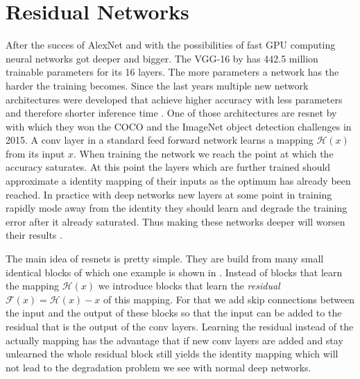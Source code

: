 \section{Residual Networks}
\label{sec:concepts:resnet}
After the succes of AlexNet \citep{krizhevsky_imagenet_2012} and with the possibilities of fast GPU computing neural networks got deeper and bigger.
The VGG-16 by \citet{simonyan_very_2014} has 442.5 million trainable parameters for its 16 layers. The more parameters a network has the harder the training becomes.
Since the last years multiple new network architectures were developed that achieve higher accuracy with less parameters and therefore shorter inference time \citep{canziani_analysis_2016}. One of those architectures are \gls{resnet} by \citet{he_deep_2016} with which they won the COCO  \citet{lin_microsoft_2014} and the ImageNet \citet{russakovsky_imagenet_2015} object detection challenges in 2015.
A \gls{conv} layer in a standard feed forward network learns a mapping $\mathcal{H}(x)$ from its input $x$. When training the network we reach the point at which the accuracy saturates. At this point the layers which are further trained should approximate a identity mapping of their inputs as the optimum has already been reached. In practice with deep networks new layers at some point in training rapidly mode away from the identity they should learn and degrade the training error after it already saturated. Thus making these networks deeper will worsen their results \citep{he_convolutional_2015}.


The main idea of \glspl{resnet} is pretty simple. They are build from many small identical blocks of which one example is shown in . Instead of blocks that learn the mapping $\mathcal{H}(x)$ we introduce blocks that learn the \textit{residual} $\mathcal{F}(x) = \mathcal{H}(x) - x$ of this mapping. For that we add skip connections between the input and the output of these blocks so that the input can be added to the residual that is the output of the \gls{conv} layers. Learning the residual instead of the actually mapping has the advantage that if new \gls{conv} layers are added and stay unlearned the whole residual block still yields the identity mapping which will not lead to the degradation problem we see with normal deep networks.

